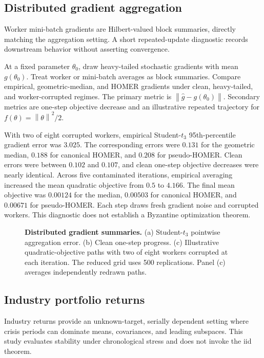 \documentclass[twoside]{article}
\theoremstyle{definition}
\newcommand{\norm}[1]{\left\lVert #1\right\rVert}
\begin{document}
\subsection{Distributed gradient aggregation}

Worker mini-batch gradients are Hilbert-valued block summaries, directly matching the aggregation setting. A short repeated-update diagnostic records downstream behavior without asserting convergence.

At a fixed parameter $\theta_0$, draw heavy-tailed stochastic gradients with mean $g(\theta_0)$. Treat worker or mini-batch averages as block summaries. Compare empirical, geometric-median, and HOMER gradients under clean, heavy-tailed, and worker-corrupted regimes. The primary metric is $\norm{\hat g-g(\theta_0)}$. Secondary metrics are one-step objective decrease and an illustrative repeated trajectory for $f(\theta)=\norm{\theta}^2/2$.

With two of eight corrupted workers, empirical Student-$t_3$ 95th-percentile gradient error was $3.025$. The corresponding errors were $0.131$ for the geometric median, $0.188$ for canonical HOMER, and $0.208$ for pseudo-HOMER. Clean errors were between $0.102$ and $0.107$, and clean one-step objective decreases were nearly identical. Across five contaminated iterations, empirical averaging increased the mean quadratic objective from $0.5$ to $4.166$. The final mean objective was $0.00124$ for the median, $0.00503$ for canonical HOMER, and $0.00671$ for pseudo-HOMER. Each step draws fresh gradient noise and corrupted workers. This diagnostic does not establish a Byzantine optimization theorem.

\begin{figure}[t]
\centering
\resizebox{\textwidth}{!}{}
\caption{\textbf{Distributed gradient summaries.}
(a) Student-$t_3$ pointwise aggregation error. (b) Clean one-step progress. (c) Illustrative quadratic-objective paths with two of eight workers corrupted at each iteration. The reduced grid uses 500 replications. Panel (c) averages independently redrawn paths.}
\label{fig:distributed-gradients}
\end{figure}

\subsection{Industry portfolio returns}

Industry returns provide an unknown-target, serially dependent setting where crisis periods can dominate means, covariances, and leading subspaces. This study evaluates stability under chronological stress and does not invoke the iid theorem.
\end{document}
